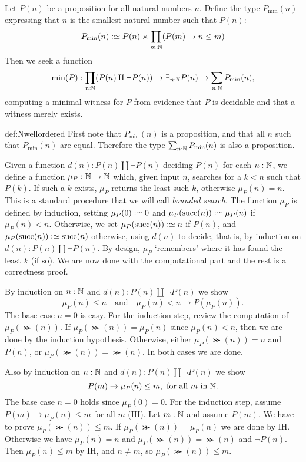 \begin{construction}
\label{def:Nwellordered}
Let $P(n)$ be a proposition for all natural numbers $n$.
Define the type $P_{\min}(n)$ expressing that $n$ is the smallest
natural number such that $P(n)$:
\[
P_{\min}(n) \defeq P(n) \times \prod_{m:\NN} (P(m) \to n\leq m)
\]
Then we seek a function
\begin{equation}\label{eqn:min}
\min(P) : \prod_{n:\mathbb{N}}(P(n)\amalg\neg P(n)) \to 
          \exists_{n:\mathbb{N}} P(n) \to \sum_{n:\mathbb{N}} P_{\min}(n),
\end{equation}
computing a minimal witness for $P$
from evidence that $P$ is decidable and that a witness merely exists.
\end{construction}
\begin{implementation}{def:Nwellordered}
First note that $P_{\min}(n)$ is a proposition,
and that all $n$ such that $P_{\min}(n)$
are equal. Therefore the type $\sum_{n:\mathbb{N}} P_{\min}(n)$
is also a proposition. 

Given a function $d(n): P(n)\amalg\neg P(n)$ deciding $P(n)$ for each $n:\mathbb{N}$, 
we define a function $\mu_P:\mathbb{N}\to\mathbb{N}$ which,
given input $n$, searches for a $k<n$ such that $P(k)$.
If such a $k$ exists, $\mu_P$ returns the least such $k$,
otherwise $\mu_P(n)=n$.
This is a standard procedure that we will call \emph{bounded search}.
The function $\mu_P$ is defined by induction, setting
$\mu_P(0)\defeq 0$ and 
$\mu_P(\Succ(n))\defeq \mu_P(n)$ if $\mu_P(n) < n$.
Otherwise, we set $\mu_P(\Succ(n))\defeq n$ if $P(n)$,
and $\mu_P(\Succ(n))\defeq \Succ(n)$ otherwise, using $d(n)$ to decide,
that is, by induction on $d(n):P(n)\amalg\neg P(n)$.
By design, $\mu_P$ `remembers' where it has found the least $k$ (if so).
We are now done with the computational part and the rest
is a correctness proof.

By induction on $n:\mathbb{N}$ and $d(n): P(n)\amalg\neg P(n)$ we show
\[
\mu_P(n)\leq n \quad\text{and}\quad \mu_P(n)<n \to P(\mu_P(n)).
\]
The base case $n=0$ is easy. For the induction step, 
review the computation of $\mu_P(\Succ(n))$. If $\mu_P(\Succ(n))=\mu_P(n)$
since $\mu_P(n) < n$, then we are done by the induction hypothesis.
Otherwise, either $\mu_P(\Succ(n))=n$ and $P(n)$, or $\mu_P(\Succ(n))=\Succ(n)$.
In both cases we are done.

Also by induction on $n:\mathbb{N}$ and $d(n): P(n)\amalg\neg P(n)$ we show
\[
P(m) \to \mu_P(n)\leq m,~ \text{for all $m$ in $\mathbb{N}$.}
\]
The base case $n=0$ holds since $\mu_P(0)=0$. For the induction step,
assume $P(m) \to \mu_P(n)\leq m$ for all $m$ (IH). Let $m:\mathbb{N}$
and assume $P(m)$. We have to prove $\mu_P(\Succ(n))\leq m$.
If $\mu_P(\Succ(n))=\mu_P(n)$ we are done by IH. Otherwise we have
$\mu_P(n)=n$ and $\mu_P(\Succ(n)) = \Succ(n)$ and $\neg P(n)$. 
Then $\mu_P(n)\leq m$ by IH, and $n\neq m$, so $\mu_P(\Succ(n))\leq m$.


\end{implementation}
